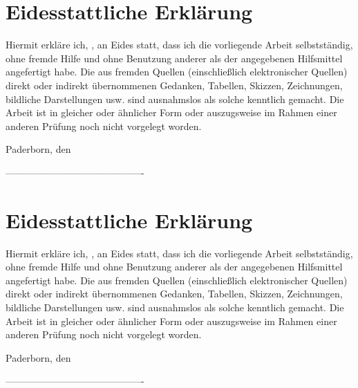 \noindent
\section*{Eidesstattliche Erklärung}

Hiermit erkläre ich, \nameFirst, an Eides statt, dass ich die vorliegende Arbeit selbstständig, ohne fremde Hilfe und ohne Benutzung anderer als der angegebenen Hilfsmittel angefertigt habe. Die aus fremden Quellen (einschließlich elektronischer Quellen) direkt oder indirekt übernommenen Gedanken, Tabellen, Skizzen, Zeichnungen, bildliche Darstellungen usw. sind ausnahmslos als solche kenntlich gemacht. Die Arbeit ist in gleicher oder ähnlicher Form oder auszugsweise im Rahmen einer anderen Prüfung noch nicht vorgelegt worden.

\bigskip

Paderborn, den \abgabedatum

\begin{flushright}
\bigskip
\bigskip
\bigskip

------------------------------------------- \\
\nameFirst
\end{flushright}

\section*{Eidesstattliche Erklärung}

Hiermit erkläre ich, \nameSecond, an Eides statt, dass ich die vorliegende Arbeit selbstständig, ohne fremde Hilfe und ohne Benutzung anderer als der angegebenen Hilfsmittel angefertigt habe. Die aus fremden Quellen (einschließlich elektronischer Quellen) direkt oder indirekt übernommenen Gedanken, Tabellen, Skizzen, Zeichnungen, bildliche Darstellungen usw. sind ausnahmslos als solche kenntlich gemacht. Die Arbeit ist in gleicher oder ähnlicher Form oder auszugsweise im Rahmen einer anderen Prüfung noch nicht vorgelegt worden.

\bigskip

Paderborn, den \abgabedatum

\begin{flushright}
\bigskip
\bigskip
\bigskip

------------------------------------------- \\
\nameSecond
\end{flushright}